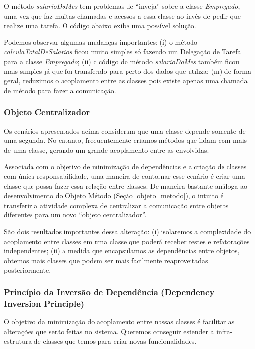 O método \textit{salarioDoMes} tem problemas de ``inveja'' sobre a classe \textit{Empregado}, uma vez que faz muitas chamadas e acessos
a essa classe ao invés de pedir que realize uma tarefa. O código abaixo exibe uma possível solução.



Podemos observar algumas mudanças 
importantes: (i) o método \textit{calculaTotalDeSalarios} ficou muito simples só fazendo um Delegação de Tarefa para a classe \textit{Empregado}; 
(ii) o código do método \textit{salarioDoMes} também ficou mais simples já que foi transferido para perto dos dados que utiliza; (iii) de forma 
geral, reduzimos o acoplamento entre as classes pois existe apenas uma chamada de método para fazer a comunicação.

\subsubsection{Objeto Centralizador}  
\label{classes:centralizador}
Os cenários apresentados acima consideram que uma classe depende somente de uma segunda. No entanto, frequentemente criamos métodos 
que lidam com mais de uma classe, gerando um grande acoplamento entre as envolvidas.

Associada com o objetivo de minimização de dependências e a criação de classes com única responsabilidade, uma 
maneira de contornar esse cenário é criar uma classe que possa fazer essa relação entre classes. De maneira 
bastante análoga ao desenvolvimento do Objeto Método 
(Seção \ref{objeto_metodo}), o intuito é transferir a atividade complexa de centralizar a comunicação entre objetos 
diferentes para um novo ``objeto centralizador''.

São dois resultados importantes dessa alteração: (i) isolaremos a complexidade do acoplamento entre classes em uma classe que poderá receber testes e refatorações independentes; (ii) a medida que encapsulamos as dependências entre objetos, obtemos mais classes que podem ser mais facilmente reaproveitadas posteriormente.

\subsubsection{Princípio da Inversão de Dependência (Dependency Inversion Principle)}
O objetivo da minimização do acoplamento entre nossas classes é facilitar as alterações que serão feitas no sistema. Queremos conseguir estender a infra-estrutura de classes que temos para criar novas funcionalidades.
	
